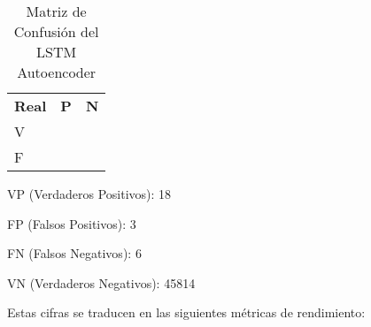 \begin{table}[ht!]
      \doublespacing
      \small
      \centering
      \begin{tabular}{ >{\centering\arraybackslash}p{3cm} >{\centering\arraybackslash}p{3cm} >{\centering\arraybackslash}p{3cm} }
            \hline
                          & \multicolumn{2}{c}{\textbf{Esperado}}              \\
            \hline
            \textbf{Real} & \textbf{P}                            & \textbf{N} \\
            \hline
            V             & 18                                    & 45814      \\
            F             & 3                                     & 6          \\
            \hline
      \end{tabular}
      \caption{Matriz de Confusión del LSTM Autoencoder}
      \label{tab:confusion_matrix_lstm}
\end{table}

VP (Verdaderos Positivos): 18

FP (Falsos Positivos): 3

FN (Falsos Negativos): 6

VN (Verdaderos Negativos): 45814

Estas cifras se traducen en las siguientes métricas de rendimiento:

